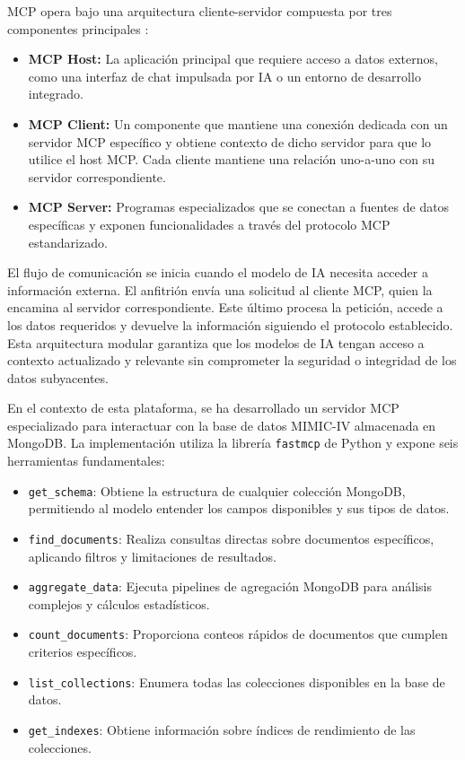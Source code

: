 MCP opera bajo una arquitectura cliente-servidor compuesta por tres componentes principales \cite{mcp_arch}:

\begin{itemize}
\item \textbf{MCP Host:} La aplicación principal que requiere acceso a datos externos, como una interfaz de chat impulsada por IA o un entorno de desarrollo integrado.
\item \textbf{MCP Client:} Un componente que mantiene una conexión dedicada con un servidor MCP específico y obtiene contexto de dicho servidor para que lo utilice el host MCP. Cada cliente mantiene una relación uno-a-uno con su servidor correspondiente.
\item \textbf{MCP Server:} Programas especializados que se conectan a fuentes de datos específicas y exponen funcionalidades a través del protocolo MCP estandarizado.
\end{itemize}

El flujo de comunicación se inicia cuando el modelo de IA necesita acceder a información externa. El anfitrión envía una solicitud al cliente MCP, quien la encamina al servidor correspondiente. Este último procesa la petición, accede a los datos requeridos y devuelve la información siguiendo el protocolo establecido. Esta arquitectura modular garantiza que los modelos de IA tengan acceso a contexto actualizado y relevante sin comprometer la seguridad o integridad de los datos subyacentes.

En el contexto de esta plataforma, se ha desarrollado un servidor MCP especializado para interactuar con la base de datos MIMIC-IV almacenada en MongoDB. La implementación utiliza la librería \texttt{fastmcp} de Python y expone seis herramientas fundamentales:

\begin{itemize}
\item \texttt{get\_schema}: Obtiene la estructura de cualquier colección MongoDB, permitiendo al modelo entender los campos disponibles y sus tipos de datos.
\item \texttt{find\_documents}: Realiza consultas directas sobre documentos específicos, aplicando filtros y limitaciones de resultados.
\item \texttt{aggregate\_data}: Ejecuta pipelines de agregación MongoDB para análisis complejos y cálculos estadísticos.
\item \texttt{count\_documents}: Proporciona conteos rápidos de documentos que cumplen criterios específicos.
\item \texttt{list\_collections}: Enumera todas las colecciones disponibles en la base de datos.
\item \texttt{get\_indexes}: Obtiene información sobre índices de rendimiento de las colecciones.
\end{itemize}

